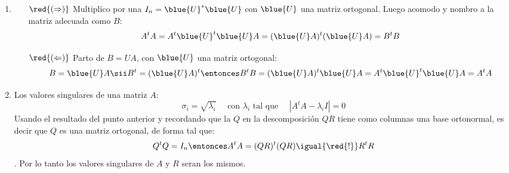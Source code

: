 \begin{enumerate}[label=(\alph*)]
  \item
        \begin{itemize}
          \item[$\red{(\Rightarrow)}$]
                Multiplico por una $I_n = \blue{U}^* \blue{U}$ con $\blue{U}$ una matriz ortogonal. Luego acomodo y nombro a la matriz adecuada como $B$:
                $$
                  A^tA =
                  A^t \blue{U}^t \blue{U} A =
                  (\blue{U}A)^t (\blue{U} A) =
                  B^t B
                $$

          \item[$\red{(\Leftarrow)}$]
                Parto de $B = UA$, con $\blue{U}$ una matriz ortogonal:
                $$
                  B = \blue{U}A \sii B^t = (\blue{U}A)^t
                  \entonces
                  B^tB =
                  (\blue{U}A)^t \blue{U}A =
                  A^t\blue{U}^t \blue{U}A =
                  A^t A
                $$
        \end{itemize}

  \item Los valores singulares de una matriz $A$:
        $$
          \sigma_i = \sqrt{\lambda_i} \quad \text{ con $\lambda_i$ tal que }\quad |A^tA - \lambda_iI| = 0
        $$
        Usando el resultado del punto anterior y recordando que la $Q$ en la descomposición $QR$
        tiene como columnas una base ortonormal, es decir que $Q$ es una matriz ortogonal, de forma tal que:
        $$
          Q^t Q = I_n
          \entonces
          A^tA =
          (Q R)^t (Q R) \igual{\red{!}}
          R^t R
        $$.
        Por lo tanto los valores singulares de $A$ y $R$ seran los mismos.


\end{enumerate}

